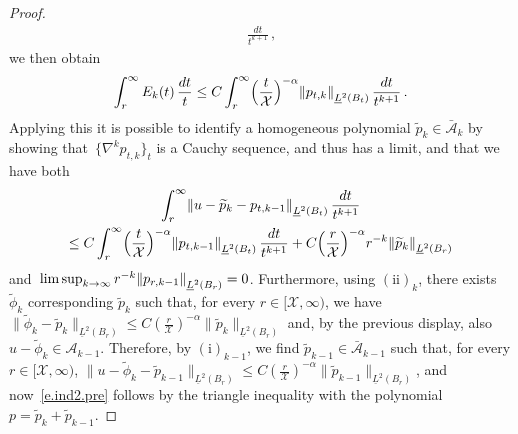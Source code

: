 \documentclass[11pt]{article} %
\numberwithin{equation}{section}
\theoremstyle{definition}
\let\originalleft\left
\let\originalright\right
\renewcommand{\left}{\mathopen{}\mathclose\bgroup\originalleft}
\renewcommand{\right}{\aftergroup\egroup\originalright}
\renewcommand*{\tilde}{\widetilde}
\newcommand{\X}{\mathcal{X}}
\newcommand{\A}{\mathcal{A}}
\newcommand{\Ahom}{\bar{\A}}
\begin{document}
\begin{proof}
\begin{align*}
\, \frac{dt}{t^{k+1} } 
\,,
\end{align*}
we then obtain
\begin{equation*}  
\int_{r}^\infty E_{k}(t) \, \frac{dt}{t} \leq C \int_{r}^\infty  \Bigl( \frac{t}{\X} \Bigr)^{-\alpha} \left\| p_{t,k} \right\|_{\underline{L}^2(B_t)} \, \frac{dt}{t^{k+1}}
\,.
\end{equation*}
Applying this it is possible to identify a homogeneous polynomial $\tilde p_{k} \in \Ahom_k$ by showing that~$\{ \nabla^k p_{t,k}\}_t$ is a Cauchy sequence, and thus has a limit, and that we have both
\begin{multline*}  
\int_{r}^\infty \left\| u - \tilde p_{k} - p_{t,k-1} \right\|_{\underline{L}^2(B_t)} 
\, \frac{dt}{t^{k+1}} 
\\
\leq 
C \int_{r}^\infty  \Bigl( \frac{t}{\X} \Bigr)^{-\alpha} \left\| p_{t,k-1} \right\|_{\underline{L}^2(B_t)}\, \frac{dt}{t^{k+1}} 
+ 
C  \Bigl( \frac{r}{\X} \Bigr)^{-\alpha} r^{-k} \left\| \tilde p_{k}\right\|_{\underline{L}^2(B_r)}
\end{multline*}
and~$\limsup_{k \to \infty}  r^{-k} \left\| p_{r,k-1} \right\|_{\underline{L}^2(B_r)} = 0$.  
Furthermore, using $\mathrm{(ii)}_{k}$, there exists $\tilde \phi_k$ corresponding $\tilde p_k$ such that, for every $r \in [\X,\infty)$, we have $ \| \tilde \phi_k -\tilde p_{k} \|_{\underline{L}^2(B_r)} \leq C ( \frac{r}{\X} )^{-\alpha}  \| \tilde p_{k} \|_{\underline{L}^2(B_r)} $ and, by the previous display, also $ u - \tilde \phi_k \in \A_{k-1}$. Therefore, by $\mathrm{(i)}_{k-1}$, we find $\tilde p_{k-1} \in \Ahom_{k-1}$ such that, for every $r \in [\X,\infty)$, $ \| u - \tilde \phi_k -\tilde p_{k-1} \|_{\underline{L}^2(B_r)} \leq C ( \frac{r}{\X} )^{-\alpha} \| \tilde p_{k-1} \|_{\underline{L}^2(B_r)}$, and now~\eqref{e.ind2.pre} follows by the triangle inequality with the polynomial $p = \tilde p_k + \tilde p_{k-1}$. 

\smallskip


\end{proof}
\end{document}
